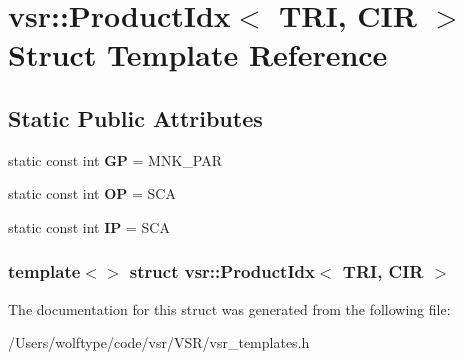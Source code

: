 \hypertarget{structvsr_1_1_product_idx_3_01_t_r_i_00_01_c_i_r_01_4}{\section{vsr\-:\-:Product\-Idx$<$ T\-R\-I, C\-I\-R $>$ Struct Template Reference}
\label{structvsr_1_1_product_idx_3_01_t_r_i_00_01_c_i_r_01_4}
}
\subsection*{Static Public Attributes}
\begin{DoxyCompactItemize}
\item 
\hypertarget{structvsr_1_1_product_idx_3_01_t_r_i_00_01_c_i_r_01_4_abeb4d0fcf44ec8518f2a17148ebb6bd2}{static const int {\bfseries G\-P} = M\-N\-K\-\_\-\-P\-A\-R}\label{structvsr_1_1_product_idx_3_01_t_r_i_00_01_c_i_r_01_4_abeb4d0fcf44ec8518f2a17148ebb6bd2}

\item 
\hypertarget{structvsr_1_1_product_idx_3_01_t_r_i_00_01_c_i_r_01_4_ae13bcd6429be7d02aa2cedb7ae7040b5}{static const int {\bfseries O\-P} = S\-C\-A}\label{structvsr_1_1_product_idx_3_01_t_r_i_00_01_c_i_r_01_4_ae13bcd6429be7d02aa2cedb7ae7040b5}

\item 
\hypertarget{structvsr_1_1_product_idx_3_01_t_r_i_00_01_c_i_r_01_4_a70db17d14841ba2b04f97f4e07aa613d}{static const int {\bfseries I\-P} = S\-C\-A}\label{structvsr_1_1_product_idx_3_01_t_r_i_00_01_c_i_r_01_4_a70db17d14841ba2b04f97f4e07aa613d}

\end{DoxyCompactItemize}
\subsubsection*{template$<$$>$ struct vsr\-::\-Product\-Idx$<$ T\-R\-I, C\-I\-R $>$}



The documentation for this struct was generated from the following file\-:\begin{DoxyCompactItemize}
\item 
/\-Users/wolftype/code/vsr/\-V\-S\-R/vsr\-\_\-templates.\-h\end{DoxyCompactItemize}

